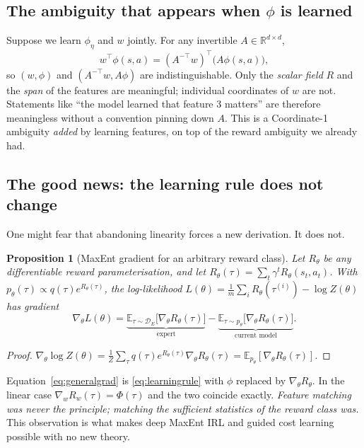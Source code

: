 \documentclass[11pt]{article}
\theoremstyle{plain}
\newtheorem{proposition}[theorem]{Proposition}
\theoremstyle{definition}
\theoremstyle{remark}
\newcommand{\E}{\mathbb{E}}
\newcommand{\R}{\mathbb{R}}
\begin{document}
\subsection{The ambiguity that appears when $\phi$ is learned}

Suppose we learn $\phi_\eta$ and $w$ jointly. For any invertible $A\in
\R^{d\times d}$,
\begin{equation}
w^\top\phi(s,a) = (A^{-\top}w)^\top\big(A\phi(s,a)\big),
\label{eq:featureambiguity}
\end{equation}
so $(w,\phi)$ and $(A^{-\top}w, A\phi)$ are indistinguishable. Only the
\emph{scalar field} $R$ and the \emph{span} of the features are
meaningful; individual coordinates of $w$ are not. Statements like ``the
model learned that feature 3 matters'' are therefore meaningless without a
convention pinning down $A$. This is a Coordinate-1 ambiguity \emph{added}
by learning features, on top of the reward ambiguity we already had.

\subsection{The good news: the learning rule does not change}

One might fear that abandoning linearity forces a new derivation. It does
not.

\begin{proposition}[MaxEnt gradient for an arbitrary reward
class]\label{prop:generalgrad}
Let $R_\theta$ be any differentiable reward parameterisation, and let
$R_\theta(\tau) = \sum_t \gamma^t R_\theta(s_t,a_t)$. With $p_\theta(\tau)
\propto q(\tau)e^{R_\theta(\tau)}$, the log-likelihood $L(\theta) =
\frac1m\sum_i R_\theta(\tau^{(i)}) - \log Z(\theta)$ has gradient
\begin{equation}
\nabla_\theta L(\theta) = \underbrace{\E_{\tau\sim\mathcal{D}_E}\big[\nabla_\theta
R_\theta(\tau)\big]}_{\text{expert}} - \underbrace{\E_{\tau\sim
p_\theta}\big[\nabla_\theta R_\theta(\tau)\big]}_{\text{current model}}.
\label{eq:generalgrad}
\end{equation}
\end{proposition}

\begin{proof}
$\nabla_\theta\log Z(\theta) = \frac1Z\sum_\tau q(\tau)e^{R_\theta(\tau)}
\nabla_\theta R_\theta(\tau) = \E_{p_\theta}[\nabla_\theta R_\theta(\tau)]$.
\end{proof}

Equation~\eqref{eq:generalgrad} is \eqref{eq:learningrule} with $\phi$
replaced by $\nabla_\theta R_\theta$. In the linear case $\nabla_w
R_w(\tau) = \Phi(\tau)$ and the two coincide exactly. \emph{Feature
matching was never the principle; matching the sufficient statistics of
the reward class was.} This observation is what makes deep MaxEnt IRL
\cite{wulfmeier2015} and guided cost learning \cite{finn2016} possible
with no new theory.
\end{document}
